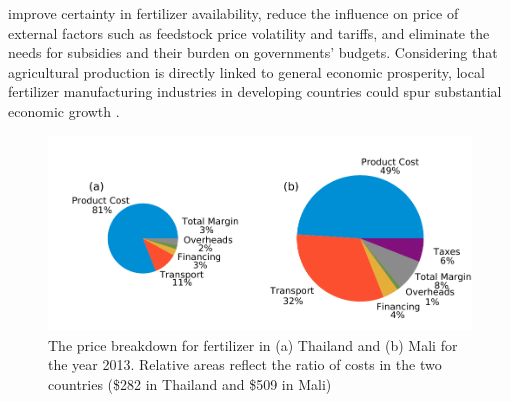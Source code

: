 improve certainty in fertilizer availability, reduce the influence on price of external factors such as feedstock price volatility and tariffs, and eliminate the needs for subsidies and their burden on governments’ budgets. Considering that agricultural production is directly linked to general economic prosperity, local fertilizer manufacturing industries in developing countries could spur substantial economic growth \cite{McArthur_2017}.




\begin{figure}
    \centering
    \includegraphics[width=1\textwidth]{Figures/Cost_Breakdown_2.pdf}
    \caption{The price breakdown for fertilizer in (a) Thailand and (b) Mali for the year 2013. Relative areas reflect the ratio of costs in the two countries (\$282 in Thailand and  \$509 in Mali) \cite{Wanzala2013}}
    \label{fig:cost_pies}
\end{figure}





